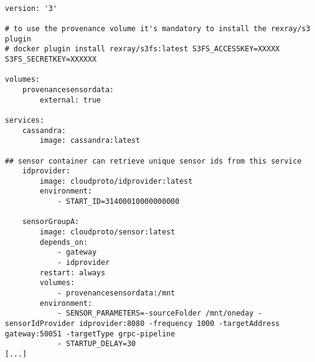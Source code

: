\begin{lstlisting}[label=lst:sensorsscale, basicstyle=\small,caption=Example for scalable sensor groups with unique sensor containers]

version: '3'

# to use the provenance volume it's mandatory to install the rexray/s3 plugin
# docker plugin install rexray/s3fs:latest S3FS_ACCESSKEY=XXXXX S3FS_SECRETKEY=XXXXXX

volumes:
    provenancesensordata:
        external: true

services:
    cassandra:
        image: cassandra:latest

## sensor container can retrieve unique sensor ids from this service
    idprovider:
        image: cloudproto/idprovider:latest
        environment:
            - START_ID=31400010000000000

    sensorGroupA:
        image: cloudproto/sensor:latest
        depends_on:
            - gateway
            - idprovider
        restart: always
        volumes:
            - provenancesensordata:/mnt
        environment:
            - SENSOR_PARAMETERS=-sourceFolder /mnt/oneday -sensorIdProvider idprovider:8080 -frequency 1000 -targetAddress gateway:50051 -targetType grpc-pipeline
            - STARTUP_DELAY=30
[...]            
\end{lstlisting}
